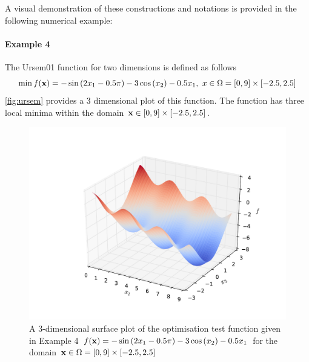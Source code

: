 A visual demonstration of these constructions and notations is provided in the following numerical example:

\paragraph{Example 4} The Ursem01 function for two dimensions is defined as follows \cite{Gavana2016}
\begin{equation*}
\min f(\bold{x}) =  \displaystyle - \sin{\left(2 x_1  - 0.5 \pi \right) - 3 \cos{\left(x_2\right)}} - 0.5 x_1 , ~ x \in \Omega =  [0, 9] \times [-2.5, 2.5] 
\end{equation*}
\autoref{fig:ursem} provides a 3 dimensional plot of this function. The function has three local minima within the domain $\bold{x} \in [0, 9] \times [-2.5, 2.5]$.

\begin{figure} 
\centerline{\includegraphics[scale=0.7]{./Fig6.pdf}}
{\caption{A 3-dimensional surface plot of the optimisation test function given in Example 4 $ f(\bold{x}) =  \displaystyle - \sin{\left(2 x_1  - 0.5 \pi \right) - 3 \cos{\left(x_2\right)}} - 0.5 x_1$ for the domain $\bold{x} \in \Omega = [0, 9] \times [-2.5, 2.5] $} \label{fig:ursem}}
\end{figure}

